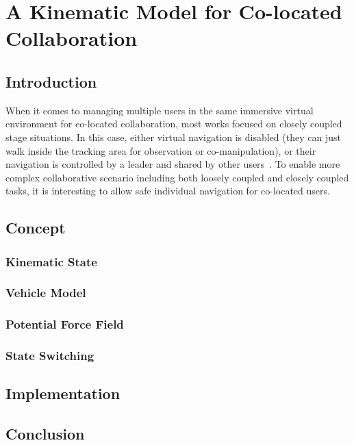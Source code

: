 \chapter{A Kinematic Model for Co-located Collaboration}
\label{chapter:kinematics}
\minitoc

\section{Introduction}
When it comes to managing multiple users in the same immersive virtual environment for co-located collaboration, most works focused on closely coupled stage situations. In this case, either virtual navigation is disabled (they can just walk inside the tracking area for observation or co-manipulation), or their navigation is controlled by a leader and shared by other users~\citep{Beck2013GGT, Kulik2011CSS}. To enable more complex collaborative scenario including both loosely coupled and closely coupled tasks, it is interesting to allow safe individual navigation for co-located users.

\section{Concept}
\subsection{Kinematic State}
\subsection{Vehicle Model}
\subsection{Potential Force Field}
\subsection{State Switching}

\section{Implementation}

\section{Conclusion}

